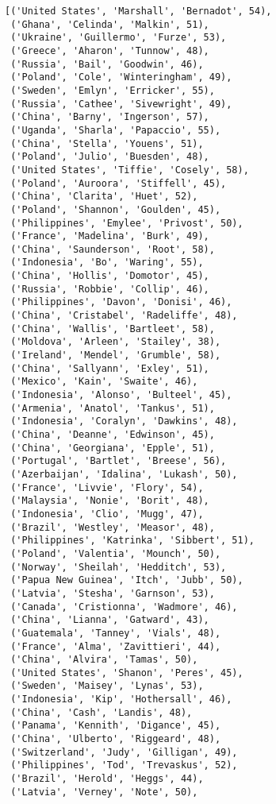 \documentclass[11pt]{article}
\makeatletter
\newcommand{\boxspacing}{\kern\kvtcb@left@rule\kern\kvtcb@boxsep}
\newcommand{\prompt}[4]{
        \ttfamily\llap{{\color{#2}[#3]:\hspace{3pt}#4}}\vspace{-\baselineskip}
    }
\makeatother
\begin{document}
            \begin{tcolorbox}[breakable, size=fbox, boxrule=.5pt, pad at break*=1mm, opacityfill=0]
\prompt{Out}{outcolor}{7}{\boxspacing}
\begin{Verbatim}[commandchars=\\\{\}]
[('United States', 'Marshall', 'Bernadot', 54),
 ('Ghana', 'Celinda', 'Malkin', 51),
 ('Ukraine', 'Guillermo', 'Furze', 53),
 ('Greece', 'Aharon', 'Tunnow', 48),
 ('Russia', 'Bail', 'Goodwin', 46),
 ('Poland', 'Cole', 'Winteringham', 49),
 ('Sweden', 'Emlyn', 'Erricker', 55),
 ('Russia', 'Cathee', 'Sivewright', 49),
 ('China', 'Barny', 'Ingerson', 57),
 ('Uganda', 'Sharla', 'Papaccio', 55),
 ('China', 'Stella', 'Youens', 51),
 ('Poland', 'Julio', 'Buesden', 48),
 ('United States', 'Tiffie', 'Cosely', 58),
 ('Poland', 'Auroora', 'Stiffell', 45),
 ('China', 'Clarita', 'Huet', 52),
 ('Poland', 'Shannon', 'Goulden', 45),
 ('Philippines', 'Emylee', 'Privost', 50),
 ('France', 'Madelina', 'Burk', 49),
 ('China', 'Saunderson', 'Root', 58),
 ('Indonesia', 'Bo', 'Waring', 55),
 ('China', 'Hollis', 'Domotor', 45),
 ('Russia', 'Robbie', 'Collip', 46),
 ('Philippines', 'Davon', 'Donisi', 46),
 ('China', 'Cristabel', 'Radeliffe', 48),
 ('China', 'Wallis', 'Bartleet', 58),
 ('Moldova', 'Arleen', 'Stailey', 38),
 ('Ireland', 'Mendel', 'Grumble', 58),
 ('China', 'Sallyann', 'Exley', 51),
 ('Mexico', 'Kain', 'Swaite', 46),
 ('Indonesia', 'Alonso', 'Bulteel', 45),
 ('Armenia', 'Anatol', 'Tankus', 51),
 ('Indonesia', 'Coralyn', 'Dawkins', 48),
 ('China', 'Deanne', 'Edwinson', 45),
 ('China', 'Georgiana', 'Epple', 51),
 ('Portugal', 'Bartlet', 'Breese', 56),
 ('Azerbaijan', 'Idalina', 'Lukash', 50),
 ('France', 'Livvie', 'Flory', 54),
 ('Malaysia', 'Nonie', 'Borit', 48),
 ('Indonesia', 'Clio', 'Mugg', 47),
 ('Brazil', 'Westley', 'Measor', 48),
 ('Philippines', 'Katrinka', 'Sibbert', 51),
 ('Poland', 'Valentia', 'Mounch', 50),
 ('Norway', 'Sheilah', 'Hedditch', 53),
 ('Papua New Guinea', 'Itch', 'Jubb', 50),
 ('Latvia', 'Stesha', 'Garnson', 53),
 ('Canada', 'Cristionna', 'Wadmore', 46),
 ('China', 'Lianna', 'Gatward', 43),
 ('Guatemala', 'Tanney', 'Vials', 48),
 ('France', 'Alma', 'Zavittieri', 44),
 ('China', 'Alvira', 'Tamas', 50),
 ('United States', 'Shanon', 'Peres', 45),
 ('Sweden', 'Maisey', 'Lynas', 53),
 ('Indonesia', 'Kip', 'Hothersall', 46),
 ('China', 'Cash', 'Landis', 48),
 ('Panama', 'Kennith', 'Digance', 45),
 ('China', 'Ulberto', 'Riggeard', 48),
 ('Switzerland', 'Judy', 'Gilligan', 49),
 ('Philippines', 'Tod', 'Trevaskus', 52),
 ('Brazil', 'Herold', 'Heggs', 44),
 ('Latvia', 'Verney', 'Note', 50),

\end{Verbatim}
\end{tcolorbox}
\end{document}
